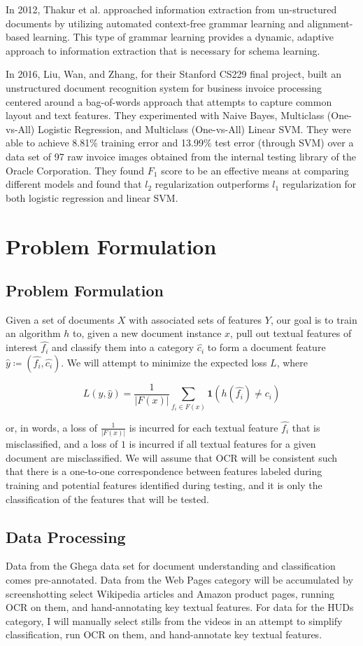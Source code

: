 \documentclass[twoside,10pt]{article}
\theoremstyle{definition}
\theoremstyle{definition}
\theoremstyle{remark}
\renewcommand{\>}{{\rightarrow}}
\renewcommand{\hat}{\widehat}
\newcommand{\1}{{\mathbf 1}}
\newcommand{\0}{{\mathbf 0}}
\begin{document}
In 2012, Thakur et al. approached information extraction from un-structured documents by utilizing automated context-free grammar learning and alignment-based learning. This type of grammar learning provides a dynamic, adaptive approach to information extraction that is necessary for schema learning.

In 2016, Liu, Wan, and Zhang, for their Stanford CS229 final project, built an unstructured document recognition system for business invoice processing centered around a bag-of-words approach that attempts to capture common layout and text features. They experimented with Naive Bayes, Multiclass (One-vs-All) Logistic Regression, and Multiclass (One-vs-All) Linear SVM. They were able to achieve 8.81\% training error and 13.99\% test error (through SVM) over a data set of 97 raw invoice images obtained from the internal testing library of the Oracle Corporation. They found $F_1$ score to be an effective means at comparing different models and found that $l_2$ regularization outperforms $l_1$ regularization for both logistic regression and linear SVM.


\section{Problem Formulation}
\subsection{Problem Formulation}
Given a set of documents $X$ with associated sets of features $Y$, our goal is to train an algorithm $h$ to, given a new document instance $x$, pull out textual features of interest $\hat{f_i}$ and classify them into a category $\hat{c_i}$ to form a document feature $\hat{y} \coloneqq (\hat{f_i}, \hat{c_i})$. We will attempt to minimize the expected loss $L$, where 

  \[ L(y, \hat{y}) = \frac{1}{|F(x)|}\sum_{f_i \in F(x)}{\mathbf{1}(h(\hat{f_i}) \ne c_i)} \] 

or, in words, a loss of $\frac{1}{|F(x)|}$ is incurred for each textual feature $\hat{f_i}$ that is misclassified, and a loss of $1$ is incurred if all textual features for a given document are misclassified. We will assume that OCR will be consistent such that there is a one-to-one correspondence between features labeled during training and potential features identified during testing, and it is only the classification of the features that will be tested.

\subsection{Data Processing}
Data from the Ghega data set for document understanding and classification comes pre-annotated. Data from the Web Pages category will be accumulated by screenshotting select Wikipedia articles and Amazon product pages, running OCR on them, and hand-annotating key textual features. For data for the HUDs category, I will manually select stills from the videos in an attempt to simplify classification, run OCR on them, and hand-annotate key textual features.
\end{document}
